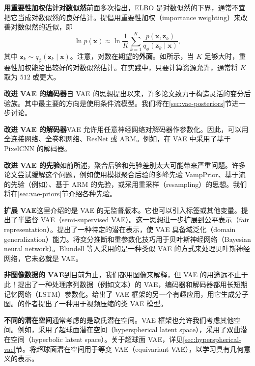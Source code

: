 \textbf{用重要性加权估计对数似然}\quad 前面多次指出，ELBO 是对数似然的下界，通常不宜把它当成对数似然的良好估计。提倡用重要性加权（importance weighting）来改善对数似然的近似，即
\begin{equation}
\ln p(\mathbf{x})\approx\ln\frac{1}{K}\sum_{k=1}^K
        \frac{p(\mathbf{x},\mathbf{z}_k)}{q_\phi(\mathbf{z}_k\mid\mathbf{x})},
\tag{5.32}\label{eq:05-32}
\end{equation}
其中 $\mathbf{z}_k\sim q_\phi(\mathbf{z}_k\mid\mathbf{x})$。注意，对数在期望的\textbf{外面}。如所示，当 $K$ 足够大时，重要性加权能给出较好的对数似然估计。在实践中，只要计算资源允许，通常将 $K$ 取为 $512$ 或更大。

\textbf{改进 VAE 的编码器}\quad 自 VAE 的思想提出以来，许多论文致力于构造灵活的变分后验族。其中最主要的方向是使用条件流模型。我们将在\ref{sec:vae-posteriors}节进一步讨论。

\textbf{改进 VAE 的解码器}\quad VAE 允许用任意神经网络对解码器作参数化。因此，可以用全连接网络、全卷积网络、ResNet 或 ARM。例如，在 VAE 中采用了基于 PixelCNN 的解码器。

\textbf{改进 VAE 的先验}\quad 如前所述，聚合后验和先验差别太大可能带来严重问题。许多论文尝试缓解这个问题，例如使用模拟聚合后验的多峰先验 VampPrior、基于流的先验（例如）、基于 ARM 的先验，或采用重采样（resampling）的思想。我们将在\ref{sec:vae-priors}节介绍各种先验。

\textbf{扩展 VAE}\quad 这里介绍的是 VAE 的无监督版本。它也可以引入标签或其他变量。提出了半监督 VAE（semi-supervised VAE）。这一思想进一步扩展到公平表示（fair representation）。提出了一种特定的潜在表示，使 VAE 具备域泛化（domain generalization）能力。将变分推断和重参数化技巧用于贝叶斯神经网络（Bayesian neural network）。Blundell 等人采用的是一种类似 VAE 的方式来处理贝叶斯神经网络，它未必就是 VAE。

\textbf{非图像数据的 VAE}\quad 到目前为止，我们都用图像来解释，但 VAE 的用途远不止于此！提出了一种处理序列数据（例如文本）的 VAE，编码器和解码器都用长短期记忆网络（LSTM）参数化。给出了 VAE 框架的另一个有趣应用，用它生成分子图。的作者提出了一种用于视频压缩的类 VAE 模型。

\textbf{不同的潜在空间}\quad 通常考虑的是欧氏潜在空间。VAE 框架也允许我们考虑其他空间。例如，采用了超球面潜在空间（hyperspherical latent space），采用了双曲潜在空间（hyperbolic latent space）。关于超球面 VAE，详见\ref{sec:hyperspherical-vae}节。将超球面潜在空间用于等变 VAE（equivariant VAE），以学习具有几何意义的表示。

